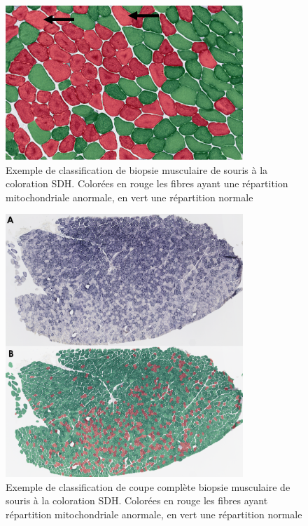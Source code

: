 \begin{figure}[!ht]
 \centering
 \includegraphics[width=0.8\textwidth]{figures/sdh_paint.png}
 \caption[Exemple de classification de biopsie musculaire de souris à la coloration SDH]{Exemple de classification de biopsie musculaire de souris à la coloration SDH. Colorées en rouge les fibres ayant une répartition mitochondriale anormale, en vert une répartition normale}
 \label{fig:sdh_paint}
\end{figure}
\begin{figure}[!ht]
 \centering
 \includegraphics[width=0.8\textwidth]{figures/wsi_sdh.png}
 \caption[Exemple de classification de coupe complète biopsie musculaire de souris à la coloration SDH]{Exemple de classification de coupe complète biopsie musculaire de souris à la coloration SDH. Colorées en rouge les fibres ayant répartition mitochondriale anormale, en vert une répartition normale}
 \label{fig:sdh_wsi_paint}
\end{figure}

